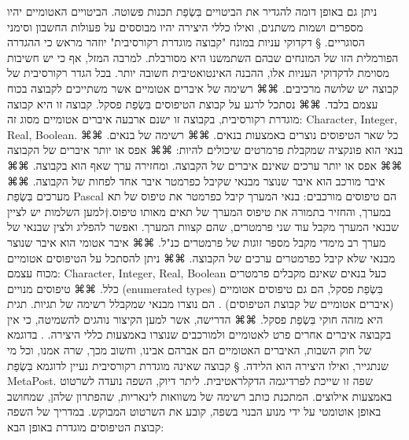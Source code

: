       ניתן גם באופן דומה להגדיר את הביטויים בִּשְׂפַת תכנות פשוטה. הביטויים האטומיים יהיו מספרים ושמות משתנים, ואילו כללי היצירה יהיו מבוססים על פעולות החשבון וסימני הסוגריים.
      § דקדוקי עניות במונח "קבוצה מוגדרת רקורסיבית"
      יוזהר מראש כי ההגדרה הפורמלית הזו של המונחים שבהם השתמשנו היא מסורבלת. למרבה המזל, אף כי יש חשיבות מסוימת לדקדוקי העניות אלו, ההבנה האינטואטיבית חשובה יותר.
      בכל הגדר רקורסיבית של קבוצה יש שלושה מרכיבים.
      ⌘⌘ רשימה של איברים אטומיים אשר משתייכים לקבוצה בכוח עצמם בלבד.
      ⌘⌘ נסתכל לרגע על קבוצת הטיפוסים בִּשְׂפַת פסקל. קבוצה זו היא קבוצה מוגדרת רקורסיבית, בקבוצה זו ישנם ארבעה איברים אטומיים מסוג זה: Character, Integer, Real, Boolean. כל שאר הטיפוסים נוצרים באמצעות בנאים.
      ⌘⌘ רשימה של בנאים.
      ⌘⌘ בנאי הוא פונקציה שמקבלת פרמרטים שיכולים להיות:
      ⌘⌘ אפס או יותר איברים של הקבוצה
      ⌘⌘ אפס או יותר ערכים שאינם איברים של הקבוצה.
      ומחזירה ערך שאף הוא בקבוצה.
      ⌘⌘ איבר מורכב הוא איבר שנוצר מבנאי שקיבל כפרמטר איבר אחד לפחות של הקבוצה.
      ⌘⌘ מערכים בִּשְׂפַת Pascal הם טיפוסים מורכבים: בנאי המערך קיבל כפרמטר את טיפוס של תא במערך, והחזיר בתמורה את טיפוס המערך של תאים מאותו טיפוס.†{למען השלמות יש לציין שבנאי המערך מקבל עוד שני פרמטרים, שהם קצוות המערך. ואפשר להפליג ולצין שבנאי של מערך רב מימדי מקבל מספר זוגות של פרמטרים כנ"ל.}
      ⌘⌘ איבר אטומי הוא איבר שנוצר מבנאי שלא קיבל כפרמטרים ערכים של הקבוצה.
      ⌘⌘ ניתן להסתכל על הטיפוסים אטומיים מכוח עצמם: Character, Integer, Real, Boolean כעל בנאים שאינם מקבלים פרמטרים כלל.
      ⌘⌘ טיפוסים מנויים (enumerated types) בִּשְׂפַת פסקל, הם גם טיפוסים אטומיים (איברים אטומיים של קבוצת הטיפוסים) . הם נוצרו מבנאי שמקבלל רשימה של תגיות. תגית היא מזהה חוקי בִּשְׂפַת פסקל.
      ⌘⌘ הדרישה, אשר למען הקיצור נוהגים להשמיטה, כי אין בקבוצה איברים אחרים פרט לאטומיים ולמורכבים שנוצרו באמצעות כללי היצירה. .
      בדוגמא של חוק השבות, האיברים האטומיים הם אברהם אבינו, וחשוב מכך, שרה אמנו, וכל מי שנתגייר, ואילו היצירה הוא הלידה.
      § קבוצה שאינה מוגדרת רקורסיבית
      נעיין לדוגמא בִּשְׂפַת MetaPost. שפה זו שייכת לפרדיגמה הדקלראטיבית. ליתר דיוק, השפה נועדה לשרטוט באמצעות אילוצים. המתכנת כותב רשימה של משוואות לינאריות, שהפתרון שלהן, שמחושב באופן אוטומטי על ידי מנוע הבנוי בשפה, קובע את השרטוט המבוקש.
      במדריך של השפה קבוצת הטיפוסים מוגדרת באופן הבא:

